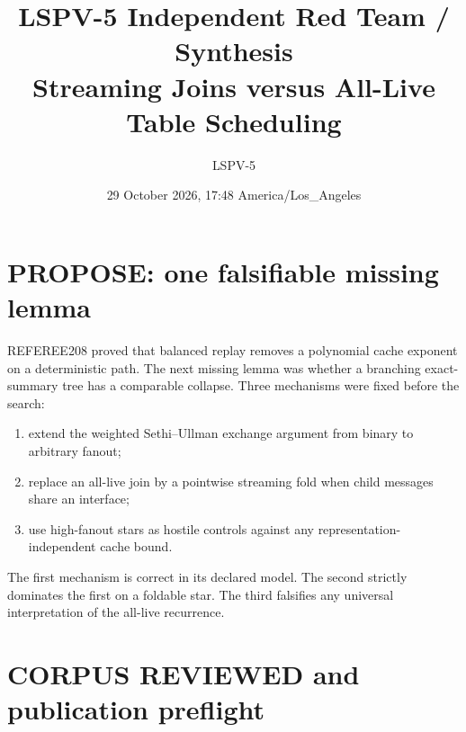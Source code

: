 \documentclass[11pt]{article}
\title{LSPV-5 Independent Red Team / Synthesis\\
Streaming Joins versus All-Live Table Scheduling}
\author{LSPV-5}
\date{29 October 2026, 17:48 America/Los\_Angeles}
\begin{document}
\sloppy
\maketitle

\begin{center}
\end{center}

\section{PROPOSE: one falsifiable missing lemma}

REFEREE208 proved that balanced replay removes a polynomial cache exponent on a deterministic path.
The next missing lemma was whether a branching exact-summary tree has a comparable collapse.  Three
mechanisms were fixed before the search:
\begin{enumerate}
\item extend the weighted Sethi--Ullman exchange argument from binary to arbitrary fanout;
\item replace an all-live join by a pointwise streaming fold when child messages share an interface;
\item use high-fanout stars as hostile controls against any representation-independent cache bound.
\end{enumerate}
The first mechanism is correct in its declared model.  The second strictly dominates the first on a
foldable star.  The third falsifies any universal interpretation of the all-live recurrence.

\section{CORPUS REVIEWED and publication preflight}
\end{document}
